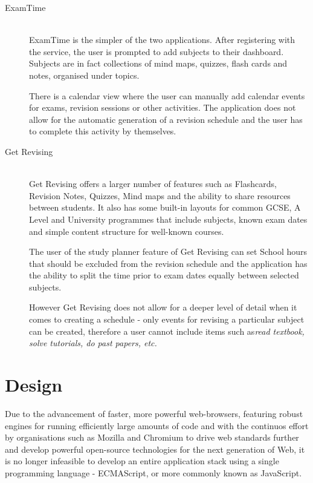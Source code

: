 \documentclass[bsc,frontabs,twoside,singlespacing,parskip]{infthesis}     %
\begin{document}
	\begin{description}
		\item[ExamTime] \hfill \\
		ExamTime is the simpler of the two applications. After registering with the service, the user is prompted to add subjects to their dashboard. Subjects are in fact collections of mind maps, quizzes, flash cards and notes, organised under topics.
		
		There is a calendar view where the user can manually add calendar events for exams, revision sessions or other activities. The application does not allow for the automatic generation of a revision schedule and the user has to complete this activity by themselves.
	
		\item[Get Revising] \hfill \\
		Get Revising offers a larger number of features such as Flashcards, Revision Notes, Quizzes, Mind maps and the ability to share resources between students. It also has some built-in layouts for common GCSE, A Level and University programmes that include subjects, known exam dates and simple content structure for well-known courses.
		
		The user of the study planner feature of Get Revising can set School hours that should be excluded from the revision schedule and the application has the ability to split the time prior to exam dates equally between selected subjects. 
		
		However Get Revising does not allow for a deeper level of detail when it comes to creating a schedule - only events for revising a particular subject can be created, therefore a user cannot include items such as\textit{read textbook, solve tutorials, do past papers, etc.}
	\end{description}
	



\chapter{Design}

	Due to the advancement of faster, more powerful web-browsers, featuring robust engines for running efficiently large amounts of  code and with the continuos effort by organisations such as Mozilla and Chromium to drive web standards further and develop powerful open-source technologies for the next generation of Web, it is no longer infeasible to develop an entire application stack using a single programming language - ECMAScript, or more commonly known as JavaScript.
	
\end{document}
